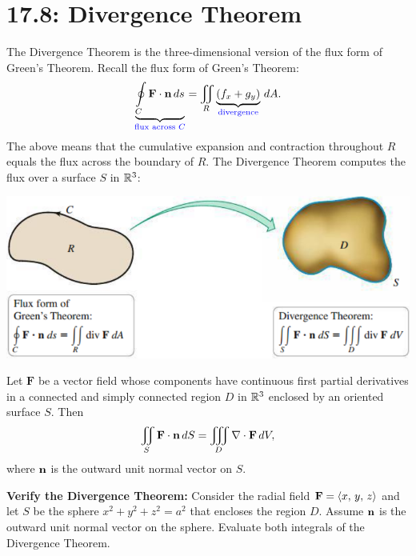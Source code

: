 \documentclass[../mathNotesPreamble]{subfiles}
\begin{document}
\section{17.8: Divergence Theorem}

    The Divergence Theorem is the three-dimensional version of the flux form of Green's Theorem. Recall the flux form of Green's Theorem:
    \[\underbrace{\oint\limits_C \mathbf F\cdot {\mathbf{n}}\,ds}_{\textcolor{blue}{\textnormal{flux across }C}}=\iint\limits_R \underbrace{(f_x+g_y)}_{\textcolor{blue}{\textnormal{divergence}}}\,dA.\]
  The above means that the cumulative expansion and contraction throughout $R$ equals the flux across the boundary of $R$. The Divergence Theorem computes the flux over a surface $S$ in $\mathbb{R}^3$:
  \begin{center}
    \includegraphics[width=0.75\linewidth]{../images/briggs_17_08/fig17_68}
  \end{center}

  \begin{thmBox*}
    Let $\mathbf F$ be a vector field whose components have continuous first partial derivatives in a connected and simply connected region $D$ in $\mathbb{R}^3$ enclosed by an oriented surface $S$. Then
      \[\iint\limits_S \mathbf F\cdot{\mathbf{n}}\,dS=\iiint\limits_D\nabla\cdot\mathbf F\,dV,\]
    where ${\mathbf{n}}$ is the outward unit normal vector on $S$.
  \end{thmBox*}
  \pagebreak

  \begin{ex*}
    \textbf{Verify the Divergence Theorem:} Consider the radial field $\mathbf F={\left\langle x,\,y,\,z \right\rangle}$ and let $S$ be the sphere $x^2+y^2+z^2=a^2$ that encloses the region $D$. Assume ${\mathbf{n}}$ is the outward unit normal vector on the sphere. Evaluate both integrals of the Divergence Theorem.
  \end{ex*}
  \pagebreak
\end{document}
